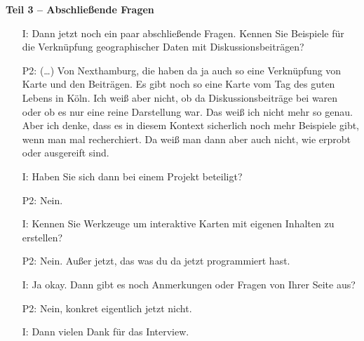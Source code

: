 \textbf{Teil 3 -- Abschlie{\ss}ende Fragen}
\begin{itemize}
    \item[I:] Dann jetzt noch ein paar abschlie{\ss}ende Fragen. Kennen Sie Beispiele f{\"u}r die Verkn{\"u}pfung geographischer Daten mit Diskussionsbeitr{\"a}gen?
    \item[P2:] (\dots) Von Nexthamburg, die haben da ja auch so eine Verkn{\"u}pfung von Karte und den Beitr{\"a}gen. Es gibt noch so eine Karte vom Tag des guten Lebens in K{\"o}ln. Ich wei{\ss} aber nicht, ob da Diskussionsbeitr{\"a}ge bei waren oder ob es nur eine reine Darstellung war. Das wei{\ss} ich nicht mehr so genau. Aber ich denke, dass es in diesem Kontext sicherlich noch mehr Beispiele gibt, wenn man mal recherchiert. Da wei{\ss} man dann aber auch nicht, wie erprobt oder ausgereift sind.
    \item[I:] Haben Sie sich dann bei einem Projekt beteiligt?
    \item[P2:] Nein.
    \item[I:] Kennen Sie Werkzeuge um interaktive Karten mit eigenen Inhalten zu erstellen?
    \item[P2:] Nein. Au{\ss}er jetzt, das was du da jetzt programmiert hast. 
    \item[I:] Ja okay. Dann gibt es noch Anmerkungen oder Fragen von Ihrer Seite aus?
    \item[P2:] Nein, konkret eigentlich jetzt nicht.
    \item[I:] Dann vielen Dank f{\"u}r das Interview.
\end{itemize}